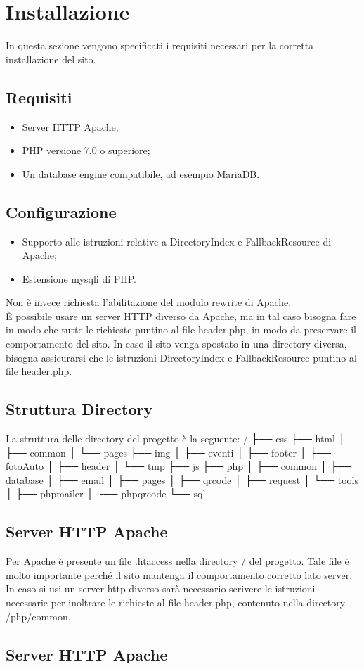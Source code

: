 \section{Installazione}
In questa sezione vengono specificati i requisiti necessari per la corretta installazione del sito.
\subsection{Requisiti}
\begin{itemize}
\item Server HTTP Apache;
\item PHP versione 7.0 o superiore;
\item Un database engine compatibile, ad esempio MariaDB.
\end{itemize}

\subsection{Configurazione}
\begin{itemize}
\item Supporto alle istruzioni relative a DirectoryIndex e FallbackResource di Apache;
\item Estensione mysqli di PHP.
\end{itemize}
Non è invece richiesta l'abilitazione del modulo rewrite di Apache.\\
È possibile usare un server HTTP diverso da Apache, ma in tal caso bisogna fare in modo che tutte le richieste puntino al file header.php, in modo da preservare il comportamento del sito.
In caso il sito venga spostato in una directory diversa, bisogna assicurarsi che le istruzioni DirectoryIndex e FallbackResource puntino al file header.php.

\subsection{Struttura Directory}
La struttura delle directory del progetto è la seguente:
/
├── css
├── html
│   ├── common
│   └── pages
├── img
│   ├── eventi
│   ├── footer
│   ├── fotoAuto
│   ├── header
│   └── tmp
├── js
├── php
│   ├── common
│   ├── database
│   ├── email
│   ├── pages
│   ├── qrcode
│   ├── request
│   └── tools
│       ├── phpmailer
│       └── phpqrcode
└── sql

\subsection{Server HTTP Apache}
Per Apache è presente un file .htaccess nella directory / del progetto.
Tale file è molto importante perché il sito mantenga il comportamento corretto lato server.
In caso si usi un server http diverso sarà necessario scrivere le istruzioni necessarie per inoltrare le richieste al file header.php, contenuto nella directory /php/common.

\subsection{Server HTTP Apache}